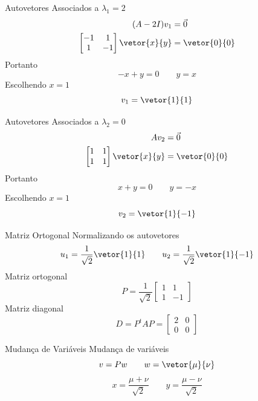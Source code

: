 \begin{resolution}{Autovetores Associados a $\lambda_1=2$}
  \begin{align*}
    (A-2I)v_1 & = \vec{0} \\
    \begin{bmatrix}
      -1&1\\
      1&-1
    \end{bmatrix}
    \vetor{x}{y}
    & = \vetor{0}{0}
  \end{align*}
  Portanto
  \[
    -x+y=0
    \qquad
    y=x
  \]
  Escolhendo \(x=1\)
  \[
    v_1=\vetor{1}{1}
  \]
\end{resolution}

\begin{resolution}{Autovetores Associados a $\lambda_2=0$}
  \begin{align*}
    Av_2 & = \vec{0} \\
    \begin{bmatrix}
      1&1\\
      1&1
    \end{bmatrix}
    \vetor{x}{y}
    & = \vetor{0}{0}
  \end{align*}
  Portanto
  \[
    x+y=0
    \qquad
    y=-x
  \]
  Escolhendo \(x=1\)
  \[
    v_2=\vetor{1}{-1}
  \]
\end{resolution}

\begin{resolution}{Matriz Ortogonal}
  Normalizando os autovetores
  \[
    u_1=\frac{1}{\sqrt{2}}\vetor{1}{1}
    \qquad
    u_2=\frac{1}{\sqrt{2}}\vetor{1}{-1}
  \]
  Matriz ortogonal
  \[
    P=\frac{1}{\sqrt{2}}
    \begin{bmatrix}
      1&1\\
      1&-1
    \end{bmatrix}
  \]
  Matriz diagonal
  \[
    D=P^tAP
    =\begin{bmatrix}
      2&0\\
      0&0
    \end{bmatrix}
  \]
\end{resolution}

\begin{resolution}{Mudança de Variáveis}
  Mudança de variáveis
  \[
    v=Pw
    \qquad
    w=\vetor{\mu}{\nu}
  \]
  \[
    x=\frac{\mu+\nu}{\sqrt{2}}
    \qquad
    y=\frac{\mu-\nu}{\sqrt{2}}
  \]
\end{resolution}

